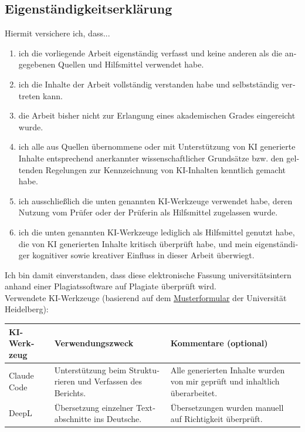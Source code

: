\documentclass[
    pdftex,
    final,
    11pt,
    a4paper,
    parskip=false,
    oneside,
    footheight=0mm,
    footinclude=false,
    toc=bibliography
]{scrbook}
\begin{document}
\begin{otherlanguage}{ngerman}
\chapter*{Eigenständigkeitserklärung}

Hiermit versichere ich, dass...

\begin{enumerate}
    \item ich die vorliegende Arbeit eigenständig verfasst und keine anderen als die angegebenen Quellen und Hilfsmittel verwendet habe.
    \item ich die Inhalte der Arbeit vollständig verstanden habe und selbstständig vertreten kann.
    \item die Arbeit bisher nicht zur Erlangung eines akademischen Grades eingereicht wurde.
    \item ich alle aus Quellen übernommene oder mit Unterstützung von KI generierte Inhalte entsprechend anerkannter wissenschaftlicher Grundsätze bzw. den geltenden Regelungen zur Kennzeichnung von KI-Inhalten kenntlich gemacht habe.
    \item ich ausschließlich die unten genannten KI-Werkzeuge verwendet habe, deren Nutzung vom Prüfer oder der Prüferin als Hilfsmittel zugelassen wurde.
    \item ich die unten genannten KI-Werkzeuge lediglich als Hilfsmittel genutzt habe, die von KI generierten Inhalte kritisch überprüft habe, und mein eigenständiger kognitiver sowie kreativer Einfluss in dieser Arbeit überwiegt.
\end{enumerate}

Ich bin damit einverstanden, dass diese elektronische Fassung universitätsintern anhand einer Plagiatssoftware auf Plagiate überprüft wird.\\

Verwendete KI-Werkzeuge {\small(basierend auf dem \href{https://backend.heiskills.uni-heidelberg.de/de/dokumente/ki-formular-de/download}{Musterformular} der Universität Heidelberg)}:

\begin{center}
\small
\begin{tabularx}{\linewidth}{|l|X|X|}
\hline
\textbf{KI-Werkzeug} & \textbf{Verwendungszweck} & \textbf{Kommentare (optional)} \\
\hline
Claude Code & Unterstützung beim Strukturieren und Verfassen des Berichts. & Alle generierten Inhalte wurden von mir geprüft und inhaltlich überarbeitet. \\
\hline
DeepL & Übersetzung einzelner Textabschnitte ins Deutsche. & Übersetzungen wurden manuell auf Richtigkeit überprüft. \\
\hline
\end{tabularx}
\end{center}


\end{otherlanguage}
\end{document}
